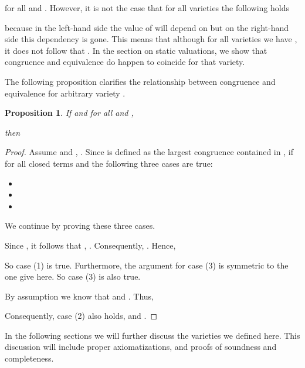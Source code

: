 \documentclass[a4paper,twoside,openright]{report}
\newtheorem{prop}[theorem]{Proposition}
\begin{document}
for all  and . However, it is not the case that for all varieties  the following holds

because in the left-hand side the value of  will depend on  but on the right-hand side this dependency is gone. This means that although for all varieties  we have , it does not follow that . In the section on static valuations, we show that congruence and equivalence do happen to coincide for that variety.

The following proposition clarifies the relationship between congruence and equivalence for arbitrary variety .
\begin{prop}\label{equiv congr prop}
If  and for all  and , 

then

\end{prop}
\begin{proof}
Assume  and , . Since  is defined as the largest congruence contained in ,  if for all closed terms  and  the following three cases are true:
\begin{itemize}
\item[(1)] 
\item[(2)] 
\item[(3)] 
\end{itemize}
We continue by proving these three cases.

Since , it follows that , . Consequently, . Hence,

So case (1) is true. Furthermore, the argument for case (3) is symmetric to the one give here. So case (3) is also true.

By assumption we know that  and . Thus,

Consequently, case (2) also holds, and .
\end{proof}

In the following sections we will further discuss the varieties we defined here. This discussion will include proper axiomatizations, and proofs of soundness and completeness.
\end{document}
